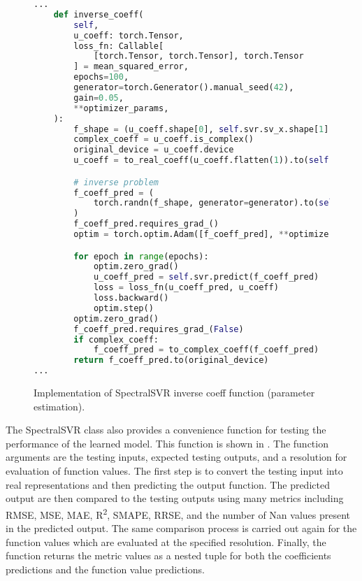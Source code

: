 \begin{figure}[H]
  \centering
  \begin{lstlisting}[language=Python]
...
    def inverse_coeff(
        self,
        u_coeff: torch.Tensor,
        loss_fn: Callable[
            [torch.Tensor, torch.Tensor], torch.Tensor
        ] = mean_squared_error,
        epochs=100,
        generator=torch.Generator().manual_seed(42),
        gain=0.05,
        **optimizer_params,
    ):
        f_shape = (u_coeff.shape[0], self.svr.sv_x.shape[1])
        complex_coeff = u_coeff.is_complex()
        original_device = u_coeff.device
        u_coeff = to_real_coeff(u_coeff.flatten(1)).to(self.svr.device)

        # inverse problem
        f_coeff_pred = (
            torch.randn(f_shape, generator=generator).to(self.svr.device) * gain
        )
        f_coeff_pred.requires_grad_()
        optim = torch.optim.Adam([f_coeff_pred], **optimizer_params)

        for epoch in range(epochs):
            optim.zero_grad()
            u_coeff_pred = self.svr.predict(f_coeff_pred)
            loss = loss_fn(u_coeff_pred, u_coeff)
            loss.backward()
            optim.step()
        optim.zero_grad()
        f_coeff_pred.requires_grad_(False)
        if complex_coeff:
            f_coeff_pred = to_complex_coeff(f_coeff_pred)
        return f_coeff_pred.to(original_device)
...
  \end{lstlisting}
  \caption{Implementation of SpectralSVR inverse coeff function (parameter estimation).}\label{fig:spectralsvr_inverse_impl}
\end{figure}

The SpectralSVR class also provides a convenience function for testing the performance of the learned model. This function is shown in . The function arguments are the testing inputs, expected testing outputs, and a resolution for evaluation of function values. The first step is to convert the testing input into real representations and then predicting the output function. The predicted output are then compared to the testing outputs using many metrics including RMSE, MSE, MAE, R\textsuperscript{2}, SMAPE, RRSE, and the number of Nan values present in the predicted output. The same comparison process is carried out again for the function values which are evaluated at the specified resolution. Finally, the function returns the metric values as a nested tuple for both the coefficients predictions and the function value predictions.

